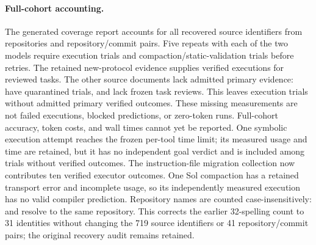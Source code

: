 \paragraph{Full-cohort accounting.}
The generated coverage report accounts for all \PilotSourceCount{} recovered
source identifiers from \CohortRepositories{} repositories and
\CohortRepositoryVersions{} repository/commit pairs. Five repeats with
each of the two models require \CohortPlannedExecutions{} execution
trials and \CohortPlannedCompactions{} compaction/static-validation trials
before retries. The retained new-protocol evidence supplies
\CohortVerifiedExecutions{} verified executions for \CohortReviewedTasks{} reviewed
tasks. The other \CohortUnreviewedTasks{} source documents lack admitted
primary evidence: \CohortQuarantinedTasks{} have quarantined trials, and
\CohortTasksWithoutFrozenReview{} lack frozen task reviews. This leaves
\CohortUnmeasuredExecutions{} execution trials without admitted primary
verified outcomes. These missing measurements are not failed executions,
blocked predictions, or zero-token runs. Full-cohort accuracy, token costs,
and wall times cannot yet be reported.
One symbolic execution attempt reaches the frozen per-tool time limit;
its measured usage and time are retained, but it has no independent goal
verdict and is included among trials without verified outcomes.
The instruction-file migration collection now contributes ten verified executor
outcomes. One Sol compaction has a retained transport error and incomplete usage,
so its independently measured execution has no valid compiler prediction.
Repository names are counted case-insensitively: 
 and  resolve to the same repository.
This corrects the earlier 32-spelling count to 31 identities without
changing the 719 source identifiers or 41 repository/commit pairs;
the original recovery audit remains retained.

